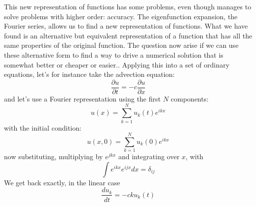 This new representation of functions has some problems, even though manages to solve problems with higher order: accuracy. The eigenfunction expansion, the Fourier series, allows us to find a new representation of functions. What we have found is an alternative but equivalent representation of a function that has all the same properties of the original function. The question now arise if we can use these alternative form to find a way to drive a numerical solution that is somewhat better or cheaper or easier.. Applying this into a set of ordinary equations, let's for instance take the advection equation:
$$ \frac{\partial u}{\partial t}=-c\frac{\partial u}{\partial x} $$
and let's use a Fourier representation using the first $N$ components: 
\begin{equation}\label{eq.u(x)}
    u(x)=\displaystyle\sum_{k=1}^Nu_k(t)e^{ikx}
\end{equation} with the initial condition:
\begin{equation}\label{eq.u(x,0)}
    u(x,0)=\displaystyle\sum_{k=1}^Nu_k(0)e^{ikx}
\end{equation}
now substituting, multiplying by $e^{jkx}$ and integrating  over $x$, with $$\int e^{ikx}e^{ijx}dx=\delta_{ij}$$
We get back exactly, in the linear case
\begin{equation}
    \frac{du_k}{dt}=-cku_k(t)
\end{equation}

